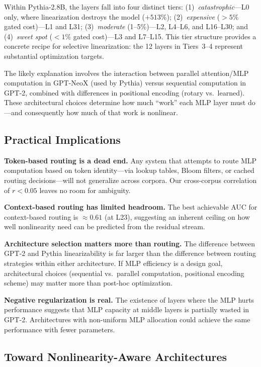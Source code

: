 \documentclass[11pt]{article}
\begin{document}
Within Pythia-2.8B, the layers fall into four distinct tiers: (1)~\textit{catastrophic}---L0 only, where linearization destroys the model ($+513\%$); (2)~\textit{expensive} ($>5\%$ gated cost)---L1 and L31; (3)~\textit{moderate} (1--5\%)---L2, L4--L6, and L16--L30; and (4)~\textit{sweet spot} ($<1\%$ gated cost)---L3 and L7--L15. This tier structure provides a concrete recipe for selective linearization: the 12 layers in Tiers~3--4 represent substantial optimization targets.

The likely explanation involves the interaction between parallel attention/MLP computation in GPT-NeoX (used by Pythia) versus sequential computation in GPT-2, combined with differences in positional encoding (rotary vs.\ learned). These architectural choices determine how much ``work'' each MLP layer must do---and consequently how much of that work is nonlinear.

\subsection{Practical Implications}

\textbf{Token-based routing is a dead end.} Any system that attempts to route MLP computation based on token identity---via lookup tables, Bloom filters, or cached routing decisions---will not generalize across corpora. Our cross-corpus correlation of $r < 0.05$ leaves no room for ambiguity.

\textbf{Context-based routing has limited headroom.} The best achievable AUC for context-based routing is $\approx 0.61$ (at L23), suggesting an inherent ceiling on how well nonlinearity need can be predicted from the residual stream.

\textbf{Architecture selection matters more than routing.} The difference between GPT-2 and Pythia linearizability is far larger than the difference between routing strategies within either architecture. If MLP efficiency is a design goal, architectural choices (sequential vs.\ parallel computation, positional encoding scheme) may matter more than post-hoc optimization.

\textbf{Negative regularization is real.} The existence of layers where the MLP hurts performance suggests that MLP capacity at middle layers is partially wasted in GPT-2. Architectures with non-uniform MLP allocation could achieve the same performance with fewer parameters.

\subsection{Toward Nonlinearity-Aware Architectures}
\label{sec:future}
\end{document}
